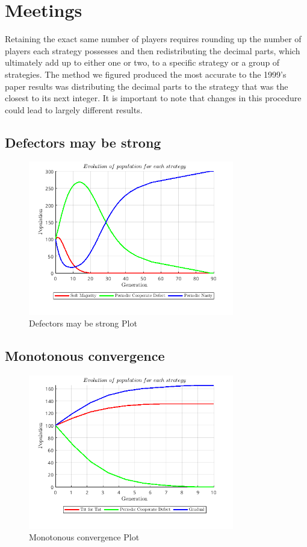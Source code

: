 
\section{Meetings}
Retaining the exact same number of players requires rounding up the number of players each strategy possesses and then redistributing the decimal parts, which ultimately add up to either one or two, to a specific strategy or a group of strategies. The method we figured produced the most accurate to the 1999's paper results was distributing the decimal parts to the strategy that was the closest to its next integer. It is important to note that changes in this procedure could lead to largely different results.

\subsection{Defectors may be strong}
\begin{figure}[H]
    \centering
    \includegraphics[width=0.8\textwidth]{media/meetings/defectors_may_be_strong.png}
    \caption{Defectors may be strong Plot}
\end{figure}

\subsection{Monotonous convergence}
\begin{figure}[H]
    \centering
    \includegraphics[width=0.8\textwidth]{media/meetings/monotonous_convergence.png}
    \caption{Monotonous convergence Plot}
\end{figure}

